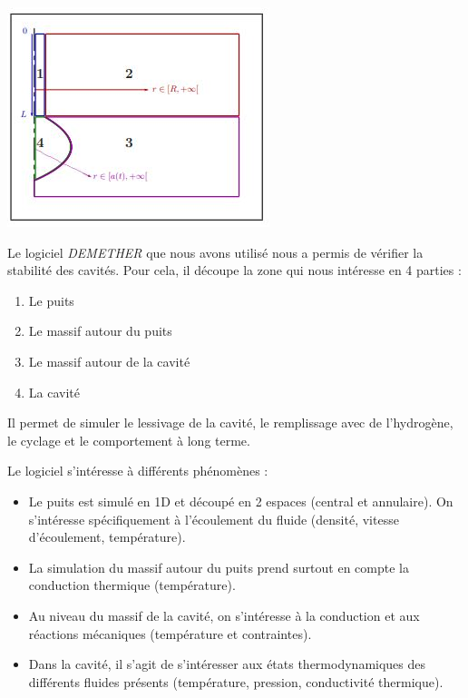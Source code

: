 \documentclass[11pt,french,a4paper]{article}
\begin{document}
\begin{multicols}{2}

\begin{center}
\includegraphics[width=.9\linewidth]{image/chap2/schema_cav.jpg}
\end{center}

Le logiciel \emph{DEMETHER} que nous avons utilisé nous a permis de vérifier la stabilité des cavités. Pour cela, il découpe la zone qui nous intéresse en 4 parties : 
\begin{enumerate}
\item Le puits
\item Le massif autour du puits
\item Le massif autour de la cavité
\item La cavité
\end{enumerate}
Il permet de simuler le lessivage de la cavité, le remplissage avec de l'hydrogène, le cyclage et le comportement à long terme.
\end{multicols}

Le logiciel s'intéresse à différents phénomènes : 
\begin{itemize}
\item Le puits est simulé en 1D et découpé en 2 espaces (central et annulaire). On s’intéresse spécifiquement à l’écoulement du fluide (densité, vitesse d’écoulement, température).
\item La simulation du massif autour du puits prend surtout en compte la conduction thermique (température).
\item Au niveau du massif de la cavité, on s’intéresse à la conduction et aux réactions mécaniques (température et contraintes).
\item Dans la cavité, il s’agit de s’intéresser aux états thermodynamiques des différents fluides présents (température, pression, conductivité thermique).
\end{itemize}
 
\end{document}
